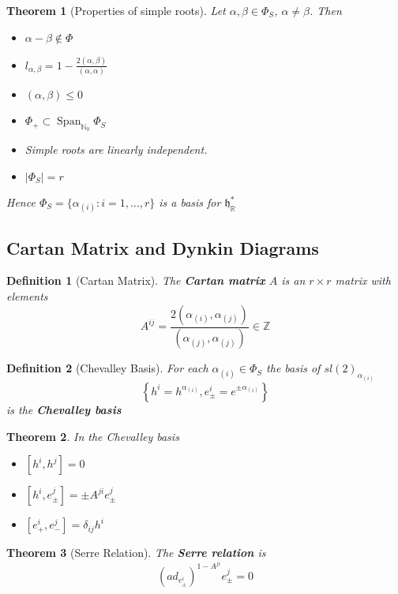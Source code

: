 \documentclass{article}
\newtheorem{theorem}{Theorem}[subsection]
\newtheorem{definition}{Definition}[subsection]
\DeclareMathOperator{\spn}{Span}
\newcommand{\bam}[1]{\textbf{#1}}
\newcommand{\mf}[1]{\mathfrak{#1}}
\newcommand{\mbb}[1]{\mathbb{#1}}
\newcommand{\comm}[2][]{\left[ #1, #2 \right]}
\begin{document}
\begin{theorem}[Properties of simple roots]
Let $\alpha,\beta\in\Phi_S$, $\alpha\neq\beta$. Then
\begin{itemize}
    \item $\alpha-\beta\notin\Phi$
    \item $l_{\alpha,\beta}=1-\frac{2(\alpha,\beta)}{(\alpha,\alpha)}$
    \item $(\alpha,\beta)\leq0$
    \item $\Phi_+\subset\spn_{\mbb{N}_0}\Phi_S$
    \item Simple roots are linearly independent.
    \item $|\Phi_S|=r$
\end{itemize}
Hence $\Phi_S=\lbrace \alpha_{(i)} : i=1,\dots,r \rbrace$ is a basis for $\mf{h}^\ast_\mbb{R}$
\end{theorem}

\subsection{Cartan Matrix and Dynkin Diagrams}

\begin{definition}[Cartan Matrix]
The \bam{Cartan matrix} $A$ is an $r \times r$ matrix with elements 
\[
A^{ij}=\frac{2(\alpha_{(i)},\alpha_{(j)})}{(\alpha_{(j)},\alpha_{(j)})}\in\mbb{Z}
\]
\end{definition}

\begin{definition}[Chevalley Basis]
For each $\alpha_{(i)}\in\Phi_S$ the basis of $sl(2)_{\alpha_{(i)}}$
\[
\left\{ h^i=h^{\alpha_{(i)}}, e^i_\pm=e^{\pm\alpha_{(i)}} \right\}
\]
is the \bam{Chevalley basis}
\end{definition}

\begin{theorem}
In the Chevalley basis
\begin{itemize}
    \item $\comm[h^i]{h^j}=0$
    \item $\comm[h^i]{e^j_\pm}=\pm A^{ji} e^j_\pm$
    \item $\comm[e^i_+]{e^j_-}=\delta_{ij} h^i$
\end{itemize}
\end{theorem}

\begin{theorem}[Serre Relation]
The \bam{Serre relation} is 
\[
\left( ad_{e^i_\pm}\right)^{1-A^{ji}} e^j_\pm=0
\]
\end{theorem}
\end{document}
